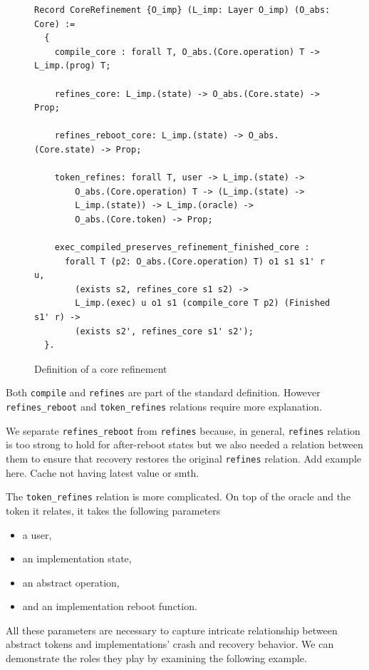 \begin{figure}[H]
    \centering
    \begin{verbatim}
Record CoreRefinement {O_imp} (L_imp: Layer O_imp) (O_abs: Core) :=
  {
    compile_core : forall T, O_abs.(Core.operation) T -> L_imp.(prog) T;
    
    refines_core: L_imp.(state) -> O_abs.(Core.state) -> Prop;
    
    refines_reboot_core: L_imp.(state) -> O_abs.(Core.state) -> Prop;
    
    token_refines: forall T, user -> L_imp.(state) -> 
        O_abs.(Core.operation) T -> (L_imp.(state) -> 
        L_imp.(state)) -> L_imp.(oracle) -> 
        O_abs.(Core.token) -> Prop;
    
    exec_compiled_preserves_refinement_finished_core :
      forall T (p2: O_abs.(Core.operation) T) o1 s1 s1' r u,
        (exists s2, refines_core s1 s2) ->
        L_imp.(exec) u o1 s1 (compile_core T p2) (Finished s1' r) ->
        (exists s2', refines_core s1' s2');
  }.
    \end{verbatim}
    \caption{Definition of a core refinement}
    \label{fig:Core_Refinement_Definition}
\end{figure}

Both \texttt{compile} and \texttt{refines} are part of the standard definition. However \texttt{refines\_reboot} and \texttt{token\_refines} relations require more explanation.

We separate \texttt{refines\_reboot} from \texttt{refines} because, in general, \texttt{refines} relation is too strong to hold for after-reboot states but we also needed a relation between them to ensure that recovery restores the original \texttt{refines} relation. {\color{red} Add example here. Cache not having latest value or smth.}

The \texttt{token\_refines} relation is more complicated. On top of the oracle and the token it relates, it takes the following parameters
\begin{itemize}
    \item a user,
    \item an implementation state,
    \item an abstract operation,
    \item and an implementation reboot function.
\end{itemize}
All these parameters are necessary to capture intricate relationship between abstract tokens and implementations' crash and recovery behavior. We can demonstrate the roles they play by examining the following example.

